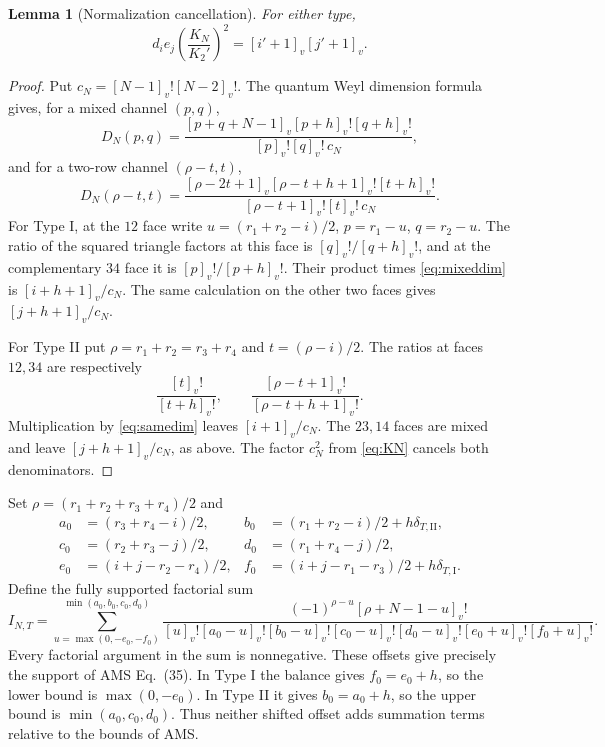 \documentclass[10pt,a4paper]{article}
\newtheorem{lemma}[theorem]{Lemma}
\newcommand{\qf}[1]{[#1]_v!}
\begin{document}
\begin{lemma}[Normalization cancellation]\label{lem:norm}
For either type,
\begin{equation}\label{eq:norm}
 d_i e_j\left(\frac{K_N}{K_2'}\right)^2
       =[i'+1]_v[j'+1]_v.
\end{equation}
\end{lemma}
\begin{proof}
Put $c_N=\qf{N-1}\qf{N-2}$.
The quantum Weyl dimension formula gives, for a mixed channel $(p,q)$,
\begin{equation}\label{eq:mixeddim}
 D_N(p,q)=\frac{[p+q+N-1]_v\qf{p+h}\qf{q+h}}
                    {\qf p\qf q\,c_N},
\end{equation}
and for a two-row channel $(\rho-t,t)$,
\begin{equation}\label{eq:samedim}
 D_N(\rho-t,t)=
 \frac{[\rho-2t+1]_v\qf{\rho-t+h+1}\qf{t+h}}
 {\qf{\rho-t+1}\qf t\,c_N}.
\end{equation}
For Type I, at the $12$ face write $u=(r_1+r_2-i)/2$,
$p=r_1-u$, $q=r_2-u$. The ratio of the squared triangle factors at this
face is $\qf q/\qf{q+h}$, and at the complementary $34$ face it is
$\qf p/\qf{p+h}$. Their product times \eqref{eq:mixeddim} is
$[i+h+1]_v/c_N$. The same calculation on the other two faces gives
$[j+h+1]_v/c_N$.

For Type II put $\rho=r_1+r_2=r_3+r_4$ and
$t=(\rho-i)/2$. The ratios at faces $12,34$ are respectively
\[
 \frac{\qf t}{\qf{t+h}},\qquad
 \frac{\qf{\rho-t+1}}{\qf{\rho-t+h+1}}.
\]
Multiplication by \eqref{eq:samedim} leaves $[i+1]_v/c_N$.
The $23,14$ faces are mixed and leave $[j+h+1]_v/c_N$, as above.
The factor $c_N^2$ from \eqref{eq:KN} cancels both denominators.
\end{proof}

Set $\rho=(r_1+r_2+r_3+r_4)/2$ and
\begin{align*}
 a_0&=(r_3+r_4-i)/2,&b_0&=(r_1+r_2-i)/2+h\delta_{T,\mathrm {II}},\\
 c_0&=(r_2+r_3-j)/2,&d_0&=(r_1+r_4-j)/2,\\
 e_0&=(i+j-r_2-r_4)/2,&f_0&=(i+j-r_1-r_3)/2+h\delta_{T,\mathrm I}.
\end{align*}
Define the fully supported factorial sum
\begin{equation}\label{eq:AMSkernel}
 I_{N,T}=\sum_{u=\max(0,-e_0,-f_0)}^{\min(a_0,b_0,c_0,d_0)}
 \frac{(-1)^{\rho-u}\qf{\rho+N-1-u}}
 {\qf u\qf{a_0-u}\qf{b_0-u}\qf{c_0-u}\qf{d_0-u}
  \qf{e_0+u}\qf{f_0+u}}.
\end{equation}
Every factorial argument in the sum is nonnegative. These offsets give
precisely the support of AMS Eq.~(35). In Type I the balance gives
$f_0=e_0+h$, so the lower bound is $\max(0,-e_0)$. In Type II it gives
$b_0=a_0+h$, so the upper bound is $\min(a_0,c_0,d_0)$. Thus neither
shifted offset adds summation terms relative to the bounds of AMS.
\end{document}
